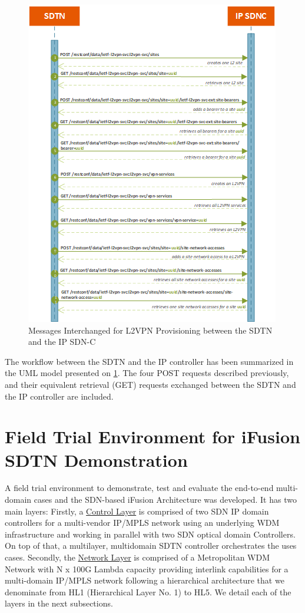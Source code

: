 \documentclass[a4paper,fleqn]{cas-dc}
\begin{document}
\begin{figure}
	\centering
		\includegraphics[width=\linewidth]{figs/l2sm_workflow_2.png}
	\caption{Messages Interchanged for L2VPN Provisioning between the SDTN and the IP SDN-C}
	\label{FIG:L2SM_workflow}
\end{figure}

The workflow between the SDTN and the IP controller has been summarized in the UML model presented on \cref{FIG:L2SM_workflow}. The four POST requests described previously, and their equivalent retrieval (GET) requests exchanged between the SDTN and the IP controller are included.

\section{Field Trial Environment for iFusion SDTN Demonstration}
\label{section:trial}

A field trial environment to demonstrate, test and evaluate the end-to-end multi-domain cases and the SDN-based iFusion Architecture was developed. It has two main layers: Firstly, a \hyperref[sec:contollay]{Control Layer} is comprised of two SDN IP domain controllers for a multi-vendor IP/MPLS network using an underlying WDM infrastructure and working in parallel with two SDN optical domain Controllers. On top of that, a multi\-layer, multi\-domain SDTN controller orchestrates the uses cases. Secondly, the \hyperref[sec:netlay]{Network Layer} is comprised of a Metropolitan WDM Network with N x 100G Lambda capacity providing interlink capabilities for a multi-domain IP/MPLS network following a hierarchical architecture that we denominate from HL1 (Hierarchical Layer No. 1) to HL5. We detail each of the layers in the next subsections. 
\end{document}

